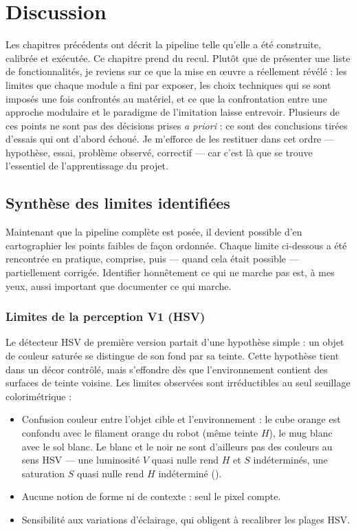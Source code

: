 \chapter{Discussion}
\label{ch:discussion}

Les chapitres précédents ont décrit la pipeline telle qu'elle a été construite,
calibrée et exécutée. Ce chapitre prend du recul. Plutôt que de présenter une
liste de fonctionnalités, je reviens sur ce que la mise en {\oe}uvre a réellement
révélé : les limites que chaque module a fini par exposer, les choix techniques
qui se sont imposés une fois confrontés au matériel, et ce que la confrontation
entre une approche modulaire et le paradigme de l'imitation laisse entrevoir.
Plusieurs de ces points ne sont pas des décisions prises \emph{a priori} : ce
sont des conclusions tirées d'essais qui ont d'abord échoué. Je m'efforce de les
restituer dans cet ordre --- hypothèse, essai, problème observé, correctif ---
car c'est là que se trouve l'essentiel de l'apprentissage du projet.

\section{Synthèse des limites identifiées}
\label{sec:disc_limites}

Maintenant que la pipeline complète est posée, il devient possible d'en cartographier
les points faibles de façon ordonnée. Chaque limite ci-dessous a été rencontrée
en pratique, comprise, puis --- quand cela était possible --- partiellement
corrigée. Identifier honnêtement ce qui ne marche pas est, à mes yeux, aussi
important que documenter ce qui marche.

\subsection{Limites de la perception V1 (HSV)}

Le détecteur HSV de première version partait d'une hypothèse simple : un objet
de couleur saturée se distingue de son fond par sa teinte. Cette hypothèse tient
dans un décor contrôlé, mais s'effondre dès que l'environnement contient des
surfaces de teinte voisine. Les limites observées sont irréductibles au seul
seuillage colorimétrique :
\begin{itemize}
  \item Confusion couleur entre l'objet cible et l'environnement : le cube orange
        est confondu avec le filament orange du robot (même teinte $H$), le mug
        blanc avec le sol blanc. Le blanc et le noir ne sont d'ailleurs pas des
        couleurs au sens HSV --- une luminosité $V$ quasi nulle rend $H$ et $S$
        indéterminés, une saturation $S$ quasi nulle rend $H$ indéterminé
        (\cite{forsyth_computer_2012}).
  \item Aucune notion de forme ni de contexte : seul le pixel compte.
  \item Sensibilité aux variations d'éclairage, qui obligent à recalibrer les
        plages HSV.
\end{itemize}

